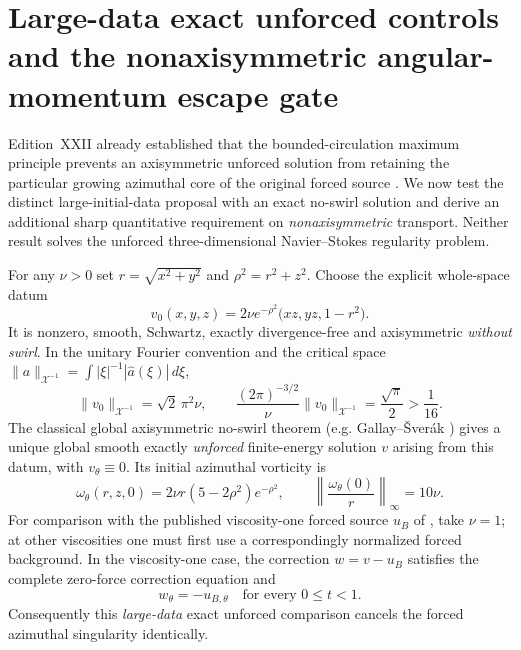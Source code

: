 
\section{Large-data exact unforced controls and the nonaxisymmetric angular-momentum escape gate}
\label{sec:xxxv-nonaxis-torque}

Edition~XXII already established that the bounded-circulation
maximum principle prevents an axisymmetric unforced solution from
retaining the particular growing azimuthal core of the original
forced source \cite{openai2026}. We now test the distinct
large-initial-data proposal with an exact no-swirl solution
and derive an additional sharp quantitative requirement on
\emph{nonaxisymmetric} transport. Neither result solves the
unforced three-dimensional Navier--Stokes regularity problem.

\begin{theorem}
\label{thm:xxxv-large-data}
For any $\nu>0$ set $r=\sqrt{x^2+y^2}$ and
$\rho^2=r^2+z^2$. Choose the explicit whole-space datum
\begin{equation}\label{eq:xxxv-initial}
\boxed{\quad
v_0(x,y,z)=2\nu e^{-\rho^2}
\bigl(xz,yz,1-r^2\bigr).\quad}
\end{equation}
It is nonzero, smooth, Schwartz, exactly divergence-free
and axisymmetric \emph{without swirl}. In the unitary
Fourier convention and the critical space
$\|a\|_{\mathcal X^{-1}}=\int|\xi|^{-1}|\widehat a(\xi)|\,d\xi$,
\begin{equation}\label{eq:xxxv-large-critical}
\boxed{\quad
\|v_0\|_{\mathcal X^{-1}}=\sqrt2\,\pi^2\nu,\qquad
\frac{(2\pi)^{-3/2}}{\nu}\|v_0\|_{\mathcal X^{-1}}
=\frac{\sqrt\pi}{2}>\frac1{16}.\quad}
\end{equation}
The classical global axisymmetric no-swirl theorem
(e.g. Gallay--\v{S}ver\'ak \cite{gallaySverak2015})
gives a unique global smooth exactly \emph{unforced}
finite-energy solution $v$ arising from this datum,
with $v_\theta\equiv0$. Its initial azimuthal vorticity is
\[
\omega_\theta(r,z,0)=
2\nu r(5-2\rho^2)e^{-\rho^2},\qquad
\left\|\frac{\omega_\theta(0)}r\right\|_\infty=10\nu.
\]
For comparison with the published viscosity-one forced source
$u_B$ of \cite{openai2026}, take $\nu=1$; at other
viscosities one must first use a correspondingly normalized
forced background. In the viscosity-one case, the correction $w=v-u_B$ satisfies the complete
zero-force correction equation and
\begin{equation}\label{eq:xxxv-swirl-cancel}
\boxed{\qquad w_\theta=-u_{B,\theta}\quad
\text{for every }0\le t<1.\qquad}
\end{equation}
Consequently this \emph{large-data} exact unforced
comparison cancels the forced azimuthal singularity
identically.
\end{theorem}
